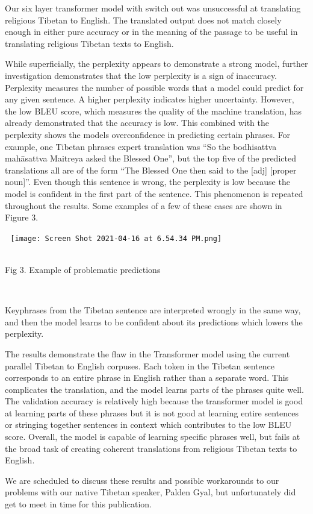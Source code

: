 \documentclass[letterpaper, 12 pt, conference]{ieeeconf}  %
\begin{document}
\par
Our six layer transformer model with switch out was unsuccessful at translating religious Tibetan to English. The translated output does not match closely enough in either pure accuracy or in the meaning of the passage to be useful in translating religious Tibetan texts to English. \par
While superficially, the perplexity appears to demonstrate a strong model, further investigation demonstrates that the low perplexity is a sign of inaccuracy. Perplexity measures the number of possible words that a model could predict for any given sentence. A higher perplexity indicates higher uncertainty. However, the low BLEU score, which measures the quality of the machine translation, has already demonstrated that the accuracy is low. This combined with the perplexity shows the models overconfidence in predicting certain phrases. For example, one Tibetan phrases expert translation was “So the bodhisattva mahāsattva Maitreya asked the Blessed One”, but the top five of the predicted translations all are of the form “The Blessed One then said to the [adj] [proper noun]”. Even though this sentence is wrong, the perplexity is low because the model is confident in the first part of the sentence. This phenomenon is repeated throughout the results. Some examples of a few of these cases are shown in Figure 3.

\newline \,\,
\texttt{[image: Screen Shot 2021-04-16 at 6.54.34 PM.png]}
\caption{\\Fig 3. Example of problematic predictions }
\newline \,\,

Keyphrases from the Tibetan sentence are interpreted wrongly in the same way, and then the model learns to be confident about its predictions which lowers the perplexity. \par
The results demonstrate the flaw in the Transformer model using the current parallel Tibetan to English corpuses. Each token in the Tibetan sentence corresponds to an entire phrase in English rather than a separate word. This complicates the translation, and the model learns parts of the phrases quite well. The validation accuracy is relatively high because the transformer model is good at learning parts of these phrases but it is not good at learning entire sentences or stringing together sentences in context which contributes to the low BLEU score. Overall, the model is capable of learning specific phrases well, but fails at the broad task of creating coherent translations from religious Tibetan texts to English. \par
We are scheduled to discuss these results and possible workarounds to our problems with our native Tibetan speaker, Palden Gyal, but unfortunately did get to meet in time for this publication.  
\end{document}
